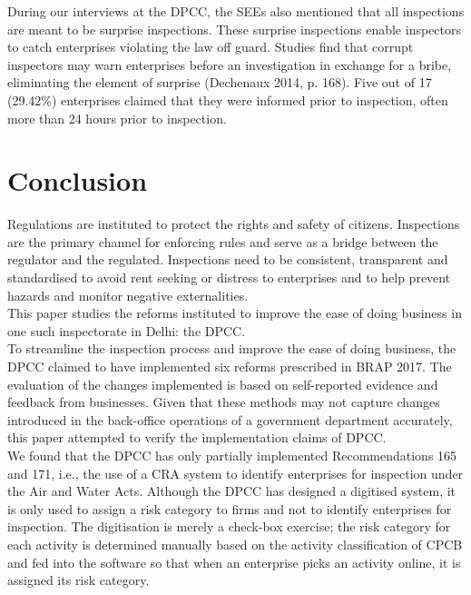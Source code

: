 \documentclass[a4paper, 12pt]{article}
\begin{document}
	
	During our interviews at the DPCC, the SEEs also mentioned that all inspections are meant to be surprise inspections. These surprise inspections enable inspectors to catch enterprises violating the law off guard. Studies find that corrupt inspectors may warn enterprises before an investigation in exchange for a bribe, eliminating the element of surprise (Dechenaux 2014, p. 168). Five out of 17 (29.42\%) enterprises claimed that they were informed prior to inspection, often more than 24 hours prior to inspection. \\
	
	\section*{Conclusion}
	
	
	Regulations are instituted to protect the rights and safety of citizens. Inspections are the primary channel for enforcing rules and serve as a bridge between the regulator and the regulated. Inspections need to be consistent, transparent and standardised to avoid rent seeking or distress to enterprises and to help prevent hazards and monitor negative externalities. \\
	
	This paper studies the reforms instituted to improve the ease of doing business in one such inspectorate in Delhi: the DPCC. \\
	
	To streamline the inspection process and improve the ease of doing business, the DPCC claimed to have implemented six reforms prescribed in BRAP 2017. The evaluation of the changes implemented is based on self-reported evidence and feedback from businesses. Given that these methods may not capture changes introduced in the back-office operations of a government department accurately, this paper attempted to verify the implementation claims of DPCC. \\
	
	We found that the DPCC has only partially implemented Recommendations 165 and 171, i.e., the use of a CRA system to identify enterprises for inspection under the Air and Water Acts. Although the DPCC has designed a digitised system, it is only used to assign a risk category to firms and not to identify enterprises for inspection. The digitisation is merely a check-box exercise; the risk category for each activity is determined manually based on the activity classification of CPCB and fed into the software so that when an enterprise picks an activity online, it is assigned its risk category. \\
	
\end{document}
